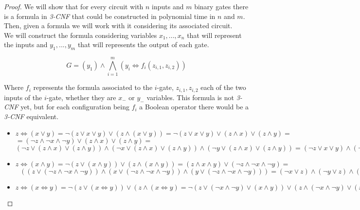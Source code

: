   \begin{proof}
    We will show that for every circuit with $n$ inputs and $m$ binary gates there is a formula in \emph{3-CNF}  that could be constructed in polynomial time in $n$ and $m$. Then, given a formula we will work with it considering its associated circuit.\\
    
    We will construct the formula considering variables $x_1,...,x_n$ that will represent the inputs and $y_1,...,y_m$ that will represents the output of each gate. 

    $$ G = (y_1) \wedge \bigwedge_{i=1}^m (y_i \iff f_i(z_{i,1},z_{i,2}))$$

    Where $f_i$ represents the formula associated to the $i$-gate, $z_{i,1},z_{i,2}$ each of the two inputs of the $i$-gate, whether they are $x_-$ or $y_-$ variables. This formula is not \emph{3-CNF} yet, but for each configuration being $f_i$ a Boolean operator there would be a \emph{3-CNF} equivalent.

    \begin{itemize}
    \item $z \iff( x \vee y )  = \neg  ( z \vee  x \vee y    ) \vee (z \wedge ( x \vee y )  ) = \neg  ( z \vee  x \vee y    ) \vee (z \wedge x)  \vee (z \wedge y ) =$\\$= ( \neg  z \wedge  \neg  x \wedge \neg   y    ) \vee (z \wedge x)  \vee (z \wedge y )  =$$
      (\neg  z \vee (z \wedge x)  \vee (z \wedge y ))  \wedge  
      (\neg  x \vee (z \wedge x)  \vee (z \wedge y )) \wedge
      (\neg  y \vee (z \wedge x)  \vee (z \wedge y ))   =
      (\neg  z \vee x  \vee y )  \wedge  
      (\neg  x \vee z  ) \wedge
      (\neg  y \vee z ) $   
    \item $z \iff( x \wedge y ) = \neg ( z \vee ( x \wedge y )) \vee (z \wedge ( x \wedge y )) = (z\wedge x \wedge y ) \vee  (\neg  z\wedge \neg  x \wedge \neg  y )  =$\\$\ \ \ ((z\vee  (\neg  z\wedge \neg  x \wedge \neg  y )  ) \wedge (x \vee  (\neg  z\wedge \neg  x \wedge \neg  y )  ) \wedge (y\vee  (\neg  z\wedge \neg  x \wedge \neg  y )  ) ) = (\neg  x \vee z) \wedge (\neg  y \vee z ) \wedge (\neg  z \vee x ) \wedge (\neg  y \vee x ) \wedge(\neg  z\vee y )\wedge (\neg  x\vee y )$
      
    \item $z \iff( x \iff y ) =  \neg ( z \vee ( x \iff y ) ) \vee (z \wedge ( x \iff y ) = \neg ( z \vee (\neg  x \wedge \neg  y) \vee (x \wedge y)) \vee (z \wedge(\neg  x \wedge \neg  y) \vee (x \wedge y))  )=(\neg  z \wedge \neg  (\neg  x \wedge \neg  y) \wedge \neg  (x \wedge y)) \vee (z \wedge(\neg  x \wedge \neg  y) \vee (x \wedge y))  )=(\neg  z \wedge  (x \vee  y) \wedge (\neg  x \vee \neg  y)) \vee (z \wedge(\neg  x \wedge \neg  y) \vee (x \wedge y))  )=z \vee ( \neg  x \wedge \neg  y) = (\neg x \vee \neg y \vee z) \wedge (\neg x \vee \neg z \vee y) \wedge (y \vee z \vee x) \wedge (y \vee \neg y \vee x) \wedge (\neg z \vee z \vee x) \wedge (\neg z \vee \neg y \vee x)$
      

\end{itemize}
\end{proof}

